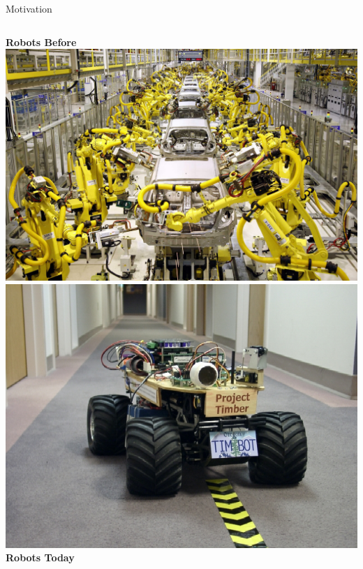 \documentclass{beamer}
\begin{document}
\begin{frame}{Motivation}
\begin{columns}[T]
\centering
\textbf{Robots Before}\\
\vspace{1em}
\includegraphics[height=0.37\textheight]{img/assembly.jpg}\\
\vspace{1em}
\includegraphics[height=0.37\textheight]{img/timbot.jpg}
\pause
{}
\centering
\vspace{-2pt}
\textbf{Robots Today}\\
\vspace{1em}

\end{columns}
\end{frame}
\end{document}
